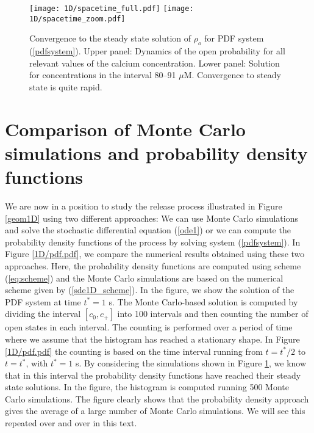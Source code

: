 
\begin{figure}[p]\centering
\vbox{
\texttt{[image: 1D/spacetime\_full.pdf]}
\texttt{[image: 1D/spacetime\_zoom.pdf]}
}
\caption{Convergence to the steady state solution of  $\rho_o$ for PDF system (\ref{pdfsystem}). Upper panel: Dynamics of the open probability for all relevant values of the calcium concentration. Lower panel: Solution for concentrations in the interval  80--91 $\mu$M.  Convergence to steady state is quite rapid. \label{1D/spacetime}}
\end{figure}


\section[Comparison of Monte Carlo simulations and PDFs]{Comparison of Monte Carlo simulations and probability density functions \label{compare}}
We are now in a position to study the release process illustrated in Figure \ref{geom1D} using two different approaches: We can use Monte Carlo simulations and solve the stochastic differential equation (\ref{ode1}) or we can compute the probability density functions of the process by solving system (\ref{pdfsystem}). In Figure \ref{1D/pdf.pdf}, we compare the numerical results obtained using these two approaches. Here, the probability density functions are computed using scheme (\ref{eq:scheme}) and the Monte Carlo simulations are based on the numerical scheme given by (\ref{sde1D_scheme}). 
In the figure, we show the solution of the PDF system at time $t^*=1$ s.  The Monte Carlo-based solution is computed by dividing the interval $[c_0,c_+]$ into 100 intervals and then counting the number of open states in each interval. The counting is performed over a period of time where we assume that the histogram has reached a stationary shape. In Figure \ref{1D/pdf.pdf}
the counting is based on the time interval running from $t=t^*/2$ to $t=t^*$, with $t^*=1$ s. By considering the simulations shown in Figure \ref{1D/spacetime}, we know that in this interval the probability density functions have reached their steady state solutions.  In the figure, the histogram is computed running 500 Monte Carlo simulations. The figure clearly shows that the probability density approach gives the average of a large number of Monte Carlo simulations. We will see this repeated over and over in this text.

